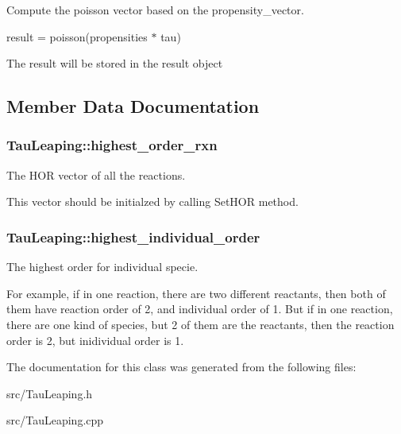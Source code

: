 Compute the poisson vector based on the propensity\_\-vector. 

result = poisson(propensities $\ast$ tau)

The result will be stored in the result object 

\subsection{Member Data Documentation}
\hypertarget{class_tau_leaping_47115e6a88b50e191eba554b8875a656}{
\subsubsection{ {\bf TauLeaping::highest\_\-order\_\-rxn}}}
\label{class_tau_leaping_47115e6a88b50e191eba554b8875a656}


The HOR vector of all the reactions. 

This vector should be initialzed by calling SetHOR method. \hypertarget{class_tau_leaping_caef70274678c4f38167d94953edad96}{
\subsubsection{ {\bf TauLeaping::highest\_\-individual\_\-order}}}
\label{class_tau_leaping_caef70274678c4f38167d94953edad96}


The highest order for individual specie. 

For example, if in one reaction, there are two different reactants, then both of them have reaction order of 2, and individual order of 1. But if in one reaction, there are one kind of species, but 2 of them are the reactants, then the reaction order is 2, but inidividual order is 1. 

The documentation for this class was generated from the following files:\begin{CompactItemize}
\item 
src/TauLeaping.h\item 
src/TauLeaping.cpp\end{CompactItemize}
